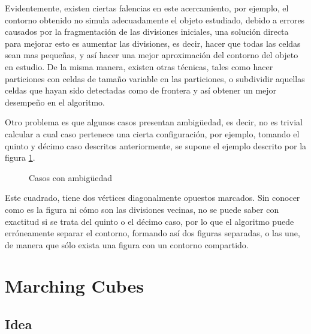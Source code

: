 Evidentemente, existen ciertas falencias en este acercamiento, por ejemplo, el contorno obtenido no simula adecuadamente el objeto estudiado, debido a errores causados por la fragmentación de las
divisiones iniciales, una solución directa para mejorar esto es aumentar las divisiones, es decir,
hacer que todas las celdas sean mas pequeñas, y así hacer una mejor aproximación del contorno
del objeto en estudio. De la misma manera, existen otras técnicas, tales como hacer particiones
con celdas de tamaño variable en las particiones, o subdividir aquellas celdas que hayan sido
detectadas como de frontera y así obtener un mejor desempeño en el algoritmo.

Otro problema es que algunos casos presentan ambigüedad, es decir, no es trivial calcular
a cual caso pertenece una cierta configuración, por ejemplo, tomando el quinto y décimo caso
descritos anteriormente, se supone el ejemplo descrito por la figura \ref{f:estadoDelArte:marchingSAmbEx}.

\begin{figure}[hbp]
\centering
\caption{Casos con ambigüedad}
\label{f:estadoDelArte:marchingSAmbEx}
\end{figure}

Este cuadrado, tiene dos vértices diagonalmente opuestos marcados. Sin conocer como es
la figura ni cómo son las divisiones vecinas, no se puede saber con exactitud si se trata del quinto
o el décimo caso, por lo que el algoritmo puede erróneamente separar el contorno, formando así
dos figuras separadas, o las une, de manera que sólo exista una figura con un contorno
compartido.

\section{Marching Cubes}
\label{sec:marchingCubes}

\subsection{Idea}
\label{subsec:marchingCubes:idea}

